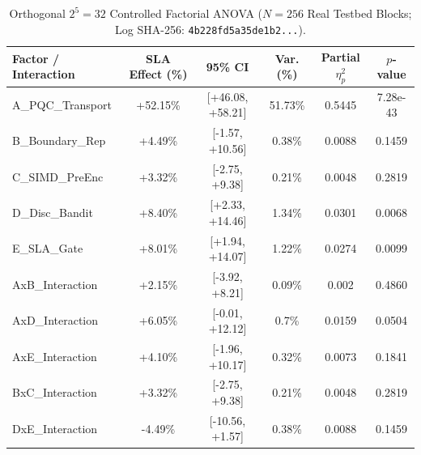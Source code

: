 \begin{table}[!t]
\centering
\caption{Orthogonal $2^5=32$ Controlled Factorial ANOVA ($N=256$ Real Testbed Blocks; Log SHA-256: \texttt{4b228fd5a35de1b2...}).}
\label{tab:factorial_anova}
\scriptsize
\setlength{\tabcolsep}{3.2pt}
\begin{tabular}{lccccc}
\toprule
\textbf{Factor / Interaction} & \textbf{SLA Effect (\%)} & \textbf{95\% CI} & \textbf{Var. (\%)} & \textbf{Partial $\eta_p^2$} & \textbf{$p$-value} \\
\midrule
A\_PQC\_Transport & +52.15\% & [+46.08, +58.21] & 51.73\% & 0.5445 & 7.28e-43 \\
B\_Boundary\_Rep & +4.49\% & [-1.57, +10.56] & 0.38\% & 0.0088 & 0.1459 \\
C\_SIMD\_PreEnc & +3.32\% & [-2.75, +9.38] & 0.21\% & 0.0048 & 0.2819 \\
D\_Disc\_Bandit & +8.40\% & [+2.33, +14.46] & 1.34\% & 0.0301 & 0.0068 \\
E\_SLA\_Gate & +8.01\% & [+1.94, +14.07] & 1.22\% & 0.0274 & 0.0099 \\
AxB\_Interaction & +2.15\% & [-3.92, +8.21] & 0.09\% & 0.002 & 0.4860 \\
AxD\_Interaction & +6.05\% & [-0.01, +12.12] & 0.7\% & 0.0159 & 0.0504 \\
AxE\_Interaction & +4.10\% & [-1.96, +10.17] & 0.32\% & 0.0073 & 0.1841 \\
BxC\_Interaction & +3.32\% & [-2.75, +9.38] & 0.21\% & 0.0048 & 0.2819 \\
DxE\_Interaction & -4.49\% & [-10.56, +1.57] & 0.38\% & 0.0088 & 0.1459 \\
\bottomrule
\end{tabular}
\end{table}